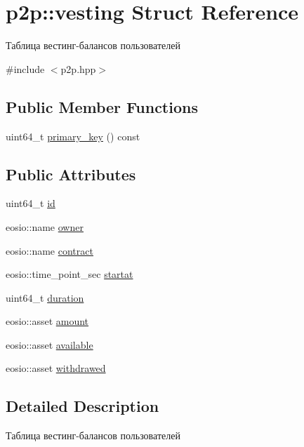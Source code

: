 \hypertarget{structp2p_1_1vesting}{}\section{p2p\+:\+:vesting Struct Reference}
\label{structp2p_1_1vesting}


Таблица вестинг-\/балансов пользователей  




{\ttfamily \#include $<$p2p.\+hpp$>$}

\subsection*{Public Member Functions}
\begin{DoxyCompactItemize}
\item 
uint64\+\_\+t \mbox{\hyperlink{structp2p_1_1vesting_a816764ab2ece434f3569aa4210d7442f}{primary\+\_\+key}} () const
\end{DoxyCompactItemize}
\subsection*{Public Attributes}
\begin{DoxyCompactItemize}
\item 
uint64\+\_\+t \mbox{\hyperlink{structp2p_1_1vesting_af92c78d429a89e9b6ce552ef480794d5}{id}}
\item 
eosio\+::name \mbox{\hyperlink{structp2p_1_1vesting_a46a58437b03f9c7947c76e91f358003e}{owner}}
\item 
eosio\+::name \mbox{\hyperlink{structp2p_1_1vesting_aa514aefb9ae797ecbf711997efb94d5b}{contract}}
\item 
eosio\+::time\+\_\+point\+\_\+sec \mbox{\hyperlink{structp2p_1_1vesting_ac2a702d706aa9146588fffb6113d1c79}{startat}}
\item 
uint64\+\_\+t \mbox{\hyperlink{structp2p_1_1vesting_a86ada5ec19fb224f483ab95bf5908547}{duration}}
\item 
eosio\+::asset \mbox{\hyperlink{structp2p_1_1vesting_a5a06c08d24cb3f9b929bc4285dd51179}{amount}}
\item 
eosio\+::asset \mbox{\hyperlink{structp2p_1_1vesting_a3759f66455f668a402c365554ad6550d}{available}}
\item 
eosio\+::asset \mbox{\hyperlink{structp2p_1_1vesting_a88ce3db1c7e1d53750a8d6e864da8c6c}{withdrawed}}
\end{DoxyCompactItemize}


\subsection{Detailed Description}
Таблица вестинг-\/балансов пользователей 

